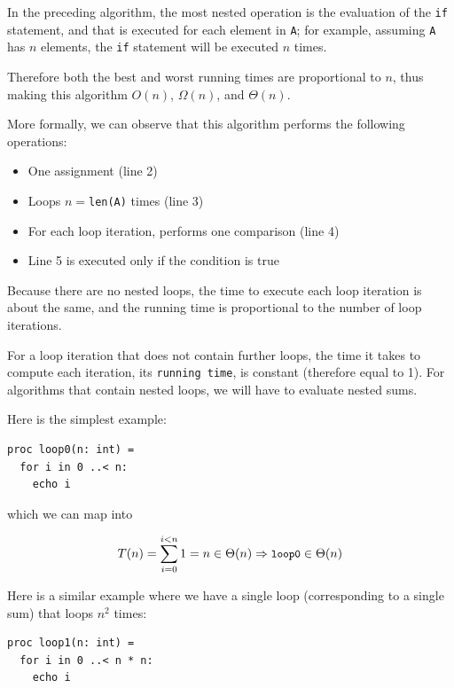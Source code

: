 \documentclass[justified, sixbynine]{tufte-book}
\def\ft{\small\tt}
\theoremstyle{plain}%
\newtheorem * {corollary}{Corollary}
\theoremstyle{definition}
\theoremstyle{remark}
\newtheorem * {remark}{Remark}
\newtheorem * {note}{Note}
\begin{document}
\begin{fullwidth}
In the preceding algorithm, the most nested operation is the evaluation of the {\ft if} statement, and that is executed for each element in {\ft A}; for example, assuming {\ft A} has $n$ elements, the {\ft if} statement will be executed $n$ times.

Therefore both the best and worst running times are proportional to $n$, thus making this algorithm $O(n)$, $\Omega(n)$, and $\Theta(n)$.

More formally, we can observe that this algorithm performs the following operations:

\begin{itemize}
\item  One assignment (line 2)

\item  Loops $n=${\ft len(A)} times (line 3)

\item  For each loop iteration, performs one comparison (line 4)

\item  Line 5 is executed only if the condition is true
\end{itemize}

Because there are no nested loops, the time to execute each loop iteration is about the same, and the running time is proportional to the number of loop iterations.

For a loop iteration that does not contain further loops, the time it takes to compute each iteration, its {\ft running time}, is constant (therefore equal to 1). For algorithms that contain nested loops, we will have to evaluate nested sums.

Here is the simplest example:

\begin{lstlisting}
proc loop0(n: int) =
  for i in 0 ..< n:
    echo i
\end{lstlisting}

which we can map into

\begin{equation}
T(n)=\sum_{i=0}^{i<n}1=n\in \Theta (n)\Rightarrow \text{{\ft loop0}}\in
\Theta (n)
\end{equation}

Here is a similar example where we have a single loop (corresponding to a single sum) that loops $n^2$ times:

\begin{lstlisting}
proc loop1(n: int) =
  for i in 0 ..< n * n:
    echo i
\end{lstlisting}


\end{fullwidth}
\end{document}
